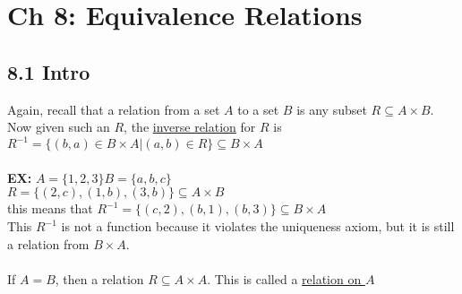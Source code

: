 \documentclass{article}
\begin{document}
		\section[04/24/18]{Ch 8: Equivalence Relations}
		\subsection*{8.1 Intro}
		Again, recall that a relation from a set $A$ to a set $B$ is any subset $R\subseteq A\times B$. Now given such an $R$, the \underline{inverse relation} for $R$ is $R^{-1}=\{(b,a)\in B\times A| (a,b)\in R\}\subseteq B\times A$\\ \\
		\textbf{EX:} $A = \{1,2,3\} B=\{a,b,c\}$\\
		$R = \{(2,c),(1,b),(3,b)\}\subseteq A\times B$\\
		this means that $R^{-1}=\{(c,2),(b,1),(b,3)\}\subseteq B\times A$\\
		This $R^{-1}$ is not a function because it violates the uniqueness axiom, but it is still a relation from $B\times A$.\\
		\\
		If $A = B$, then a relation $R\subseteq A\times A$. This is called a \underline{relation on $A$}
\end{document}
